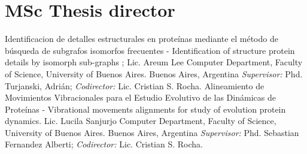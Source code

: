 \documentclass[9pt,a4paper,sans]{moderncv}
\newcommand{\DC}{Computer Department}
\newcommand{\FCEN}{Faculty of Science}
\newcommand{\UBA}{University of Buenos Aires}
\begin{document}
	\bibliographyunit
	\begin{bibunit}[plain]
		\nocite{*}
		\putbib[csrocha]
	\end{bibunit}

\section{MSc Thesis director}

	{Identificacion de detalles estructurales en proteínas mediante el método de búsqueda de subgrafos isomorfos frecuentes - Identification of structure protein details by isomorph sub-graphs ; Lic. Areum Lee}
	{\DC, \FCEN, \UBA.}
	{Buenos Aires, Argentina}
	{}
	{\emph{Supervisor:} Phd. Turjanski, Adrián; \emph{Codirector:} Lic. Cristian S. Rocha.}
	{Alineamiento de Movimientos Vibracionales para el Estudio Evolutivo de las Dinámicas de Proteínas - Vibrational movements alignments for study of evolution protein dynamics. Lic. Lucila Sanjurjo} 
	{\DC, \FCEN, \UBA.}
	{Buenos Aires, Argentina}
	{}
	{\emph{Supervisor:} Phd. Sebastian Fernandez Alberti; \emph{Codirector:} Lic. Cristian S. Rocha.}

\label{cientificos:hasta}
\end{document}

